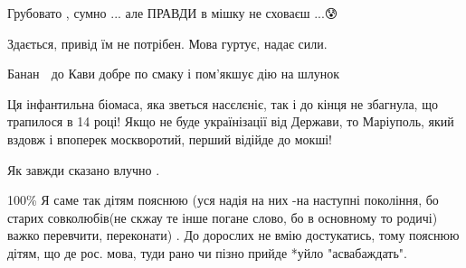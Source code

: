 \begin{itemize}
 
Грубовато , сумно ... але ПРАВДИ в мішку не сховаєш ...😰

 
Здається, привід їм не потрібен. Мова гуртує, надає сили.

 
Банан 🍌 до Кави добре по смаку і пом'якшує дію на шлунок

 

Ця інфантильна біомаса, яка зветься насєлєніє, так і до кінця не збагнула, що
трапилося в 14 році! Якщо не буде українізації від Держави, то Маріуполь, який
вздовж і впоперек москворотий, перший відійде до мокші!


 
Як завжди сказано влучно .

 

100\% Я саме так дітям пояснюю (уся надія на них -на наступні покоління, бо
старих совколюбів(не скжау те інше погане слово, бо в основному то родичі)
важко перевчити, переконати) . До дорослих не вмію достукатись, тому пояснюю
дітям, що де рос. мова, туди рано чи пізно прийде *уйло "асвабаждать".



\end{itemize}
